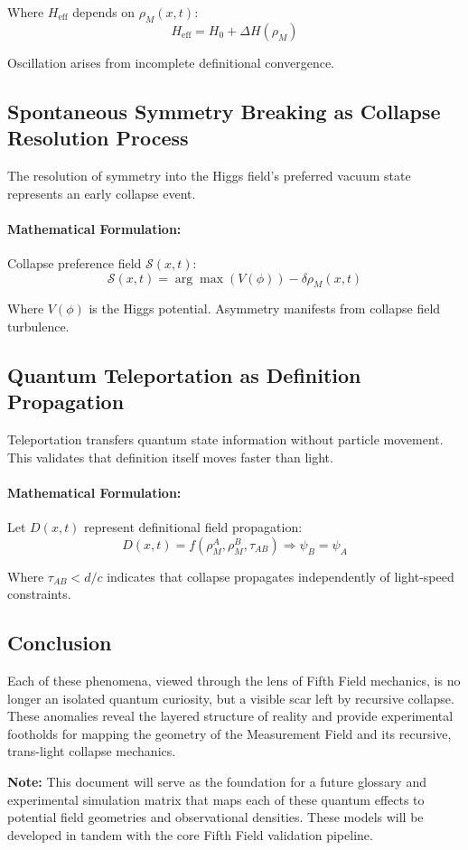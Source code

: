 Where $H_{\text{eff}}$ depends on $\rho_M(x,t)$:
\begin{equation}
H_{\text{eff}} = H_0 + \Delta H(\rho_M)
\end{equation}

Oscillation arises from incomplete definitional convergence.

\subsection{Spontaneous Symmetry Breaking as Collapse Resolution Process}
The resolution of symmetry into the Higgs field’s preferred vacuum state represents an early collapse event.

\paragraph{Mathematical Formulation:}
Collapse preference field $\mathcal{S}(x,t)$:
\begin{equation}
\mathcal{S}(x,t) = \arg\max(V(\phi)) - \delta \rho_M(x,t)
\end{equation}

Where $V(\phi)$ is the Higgs potential. Asymmetry manifests from collapse field turbulence.

\subsection{Quantum Teleportation as Definition Propagation}
Teleportation transfers quantum state information without particle movement. This validates that definition itself moves faster than light.

\paragraph{Mathematical Formulation:}
Let $D(x,t)$ represent definitional field propagation:
\begin{equation}
D(x,t) = f(\rho_M^A, \rho_M^B, \tau_{AB}) \Rightarrow \psi_B = \psi_A
\end{equation}

Where $\tau_{AB} < d/c$ indicates that collapse propagates independently of light-speed constraints.

\subsection{Conclusion}
Each of these phenomena, viewed through the lens of Fifth Field mechanics, is no longer an isolated quantum curiosity, but a visible scar left by recursive collapse. These anomalies reveal the layered structure of reality and provide experimental footholds for mapping the geometry of the Measurement Field and its recursive, trans-light collapse mechanics.

\textbf{Note:} This document will serve as the foundation for a future glossary and experimental simulation matrix that maps each of these quantum effects to potential field geometries and observational densities. These models will be developed in tandem with the core Fifth Field validation pipeline.
